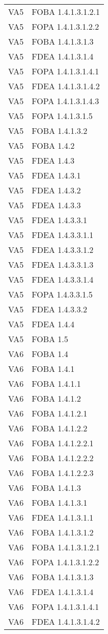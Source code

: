 \begin{longtable}{XX}
VA5&FOBA 1.4.1.3.1.2.1\\ 
VA5&FOPA 1.4.1.3.1.2.2\\ 
VA5&FOBA 1.4.1.3.1.3\\ 
VA5&FDEA 1.4.1.3.1.4\\ 
VA5&FOPA 1.4.1.3.1.4.1\\ 
VA5&FDEA 1.4.1.3.1.4.2\\ 
VA5&FOPA 1.4.1.3.1.4.3\\ 
VA5&FOPA 1.4.1.3.1.5\\ 
VA5&FOBA 1.4.1.3.2\\ 
VA5&FOBA 1.4.2\\ 
VA5&FDEA 1.4.3\\ 
VA5&FDEA 1.4.3.1\\ 
VA5&FDEA 1.4.3.2\\ 
VA5&FDEA 1.4.3.3\\ 
VA5&FDEA 1.4.3.3.1\\ 
VA5&FDEA 1.4.3.3.1.1\\ 
VA5&FDEA 1.4.3.3.1.2\\ 
VA5&FDEA 1.4.3.3.1.3\\ 
VA5&FDEA 1.4.3.3.1.4\\ 
VA5&FOPA 1.4.3.3.1.5\\ 
VA5&FDEA 1.4.3.3.2\\ 
VA5&FDEA 1.4.4\\ 
VA5&FOBA 1.5\\ 
\midrule 
VA6&FOBA 1.4\\ 
VA6&FOBA 1.4.1\\ 
VA6&FOBA 1.4.1.1\\ 
VA6&FOBA 1.4.1.2\\ 
VA6&FOBA 1.4.1.2.1\\ 
VA6&FOBA 1.4.1.2.2\\ 
VA6&FOBA 1.4.1.2.2.1\\ 
VA6&FOBA 1.4.1.2.2.2\\ 
VA6&FOBA 1.4.1.2.2.3\\ 
VA6&FOBA 1.4.1.3\\ 
VA6&FOBA 1.4.1.3.1\\ 
VA6&FDEA 1.4.1.3.1.1\\ 
VA6&FOBA 1.4.1.3.1.2\\ 
VA6&FOBA 1.4.1.3.1.2.1\\ 
VA6&FOPA 1.4.1.3.1.2.2\\ 
VA6&FOBA 1.4.1.3.1.3\\ 
VA6&FDEA 1.4.1.3.1.4\\ 
VA6&FOPA 1.4.1.3.1.4.1\\ 
VA6&FDEA 1.4.1.3.1.4.2\\ 

\end{longtable}

